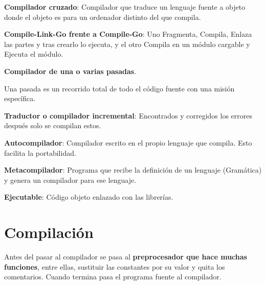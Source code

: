 \documentclass[12pt, twoside, openright]{report} %
\begin{document}
\textbf{Compilador cruzado}: Compilador que traduce un lenguaje fuente a
objeto donde el objeto es para un ordenador distinto del que compila.

\textbf{Compile-Link-Go frente a Compile-Go}: Uno Fragmenta, Compila,
Enlaza las partes y tras crearlo lo ejecuta, y el otro Compila en un
módulo cargable y Ejecuta el módulo.

\textbf{Compilador de una o varias pasadas}.

Una pasada es un recorrido total de todo el código fuente con una misión
específica.

\textbf{Traductor o compilador incremental}: Encontrados y corregidos
los errores después solo se compilan estos.

\textbf{Autocompilador}: Compilador escrito en el propio lenguaje que
compila. Esto facilita la portabilidad.

\textbf{Metacompilador}: Programa que recibe la definición de un
lenguaje (Gramática) y genera un compilador para ese lenguaje.

\textbf{Ejecutable}: Código objeto enlazado con las librerías.


\section{Compilación}


\begin{figure}[H]
	{\def\svgwidth{.8\textwidth}
		}
\end{figure}

Antes del pasar al compilador se pasa al \textbf{preprocesador que hace muchas funciones}, entre ellas, sustituir las constantes por su valor y quita los comentarios. Cuando termina pasa el programa fuente al compilador.
\begin{figure}[H]
	{}
\end{figure}
\end{document}
